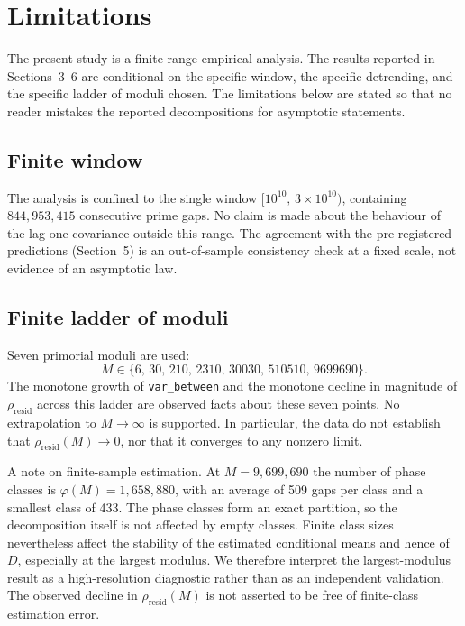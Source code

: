 \section{Limitations}

The present study is a finite-range empirical analysis. The results reported in Sections~3--6 are conditional on the specific window, the specific detrending, and the specific ladder of moduli chosen. The limitations below are stated so that no reader mistakes the reported decompositions for asymptotic statements.

\subsection{Finite window}

The analysis is confined to the single window $[10^{10},\,3\times 10^{10})$, containing $844{,}953{,}415$ consecutive prime gaps. No claim is made about the behaviour of the lag-one covariance outside this range. The agreement with the pre-registered predictions (Section~5) is an out-of-sample consistency check at a fixed scale, not evidence of an asymptotic law.

\subsection{Finite ladder of moduli}

Seven primorial moduli are used:
\[
M \in \{6,\,30,\,210,\,2310,\,30030,\,510510,\,9699690\}.
\]
The monotone growth of \texttt{var\_between} and the monotone decline in magnitude of $\rho_{\text{resid}}$ across this ladder are observed facts about these seven points. No extrapolation to $M\to\infty$ is supported. In particular, the data do not establish that $\rho_{\text{resid}}(M)\to 0$, nor that it converges to any nonzero limit.

A note on finite-sample estimation. At $M=9{,}699{,}690$ the number of phase classes is $\varphi(M) = 1{,}658{,}880$, with an average of 509 gaps per class and a smallest class of 433. The phase classes form an exact partition, so the decomposition itself is not affected by empty classes. Finite class sizes nevertheless affect the stability of the estimated conditional means and hence of $D$, especially at the largest modulus. We therefore interpret the largest-modulus result as a high-resolution diagnostic rather than as an independent validation. The observed decline in $\rho_{\text{resid}}(M)$ is not asserted to be free of finite-class estimation error.

